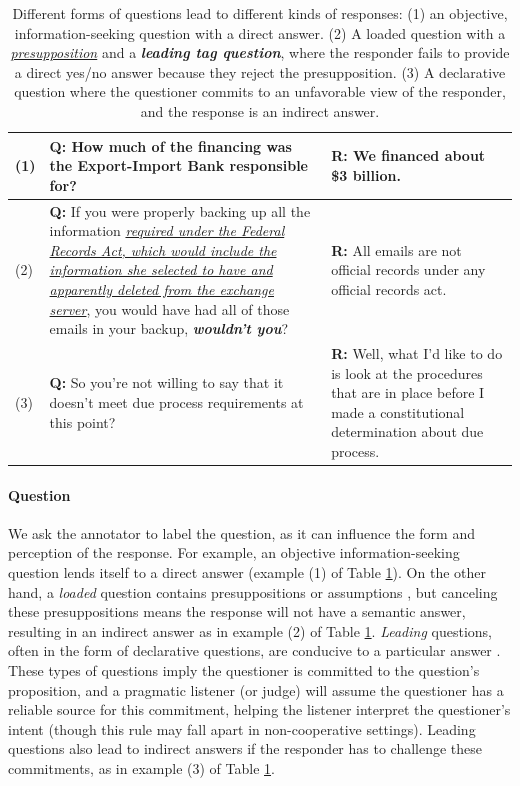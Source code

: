 \begin{table}[]
\small
    \centering
    \begin{tabular} {p{0.1cm} >{\raggedright\arraybackslash}p{6.0cm} >{\raggedright\arraybackslash}p{3.4cm}}
    \toprule
(1) &\textbf{Q: } How much of the financing was the Export-Import Bank responsible for? & \textbf{R: }We financed about \$3 billion.\\\midrule
(2) &\textbf{Q: } If you were properly backing up all the information \textit{\uline{required under the Federal Records Act, which would include the information she selected to have and apparently deleted from the exchange server}}, you would have had all of those emails in your backup, \textit{\textbf{wouldn't you}}? & \textbf{R: } All emails are not official records under any official records act.\\
\midrule
(3) &\textbf{Q: }So you're not willing to say that it doesn't meet due process requirements at this point? & \textbf{R: } 
Well, what I'd like to do is look at the procedures that are in place before I made a constitutional determination about due process.\\
\bottomrule
    \end{tabular}
    \vspace{-.5em}
    \caption{Different forms of questions lead to different kinds of responses: (1) an objective, information-seeking question with a direct answer. (2) A loaded question with a \uline{\textit{presupposition}} and a \textbf{\textit{leading tag question}}, where the responder fails to provide a direct yes/no answer because they reject the presupposition. (3) A declarative question where the questioner commits to an unfavorable view of the responder, and the response is an indirect answer.}
    \label{tab:subj_questions}
\end{table}

\paragraph{Question}
We ask the annotator to label the question, as it can influence the form and perception of the response. For example, an objective information-seeking question lends itself to a direct answer (example (1) of Table \ref{tab:subj_questions}). On the other hand, a \emph{loaded} question contains presuppositions or assumptions \cite{Walton:2003}, but canceling these presuppositions means the response will not have a semantic answer, resulting in an indirect answer \cite{Groenendijk:1984} as in example (2) of Table \ref{tab:subj_questions}. \emph{Leading} questions, often in the form of declarative questions, are conducive to a particular answer \cite{Bolinger:1957}. These types of questions imply the questioner is committed to the question's proposition, and a pragmatic listener (or judge) will assume the questioner has a reliable source for this commitment, helping the listener interpret the questioner's intent \cite{Gunlogson:2008} (though this rule may fall apart in non-cooperative settings). Leading questions also lead to indirect answers if the responder has to challenge these commitments, as in example (3) of Table \ref{tab:subj_questions}.

